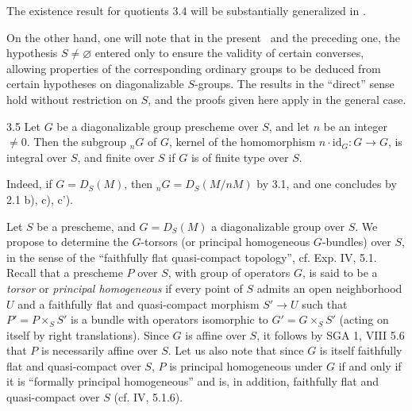\begin{remarks}{} The existence result for quotients 3.4 will be substantially generalized in .

On the other hand, one will note that in the present \No\ and the preceding one, the hypothesis $S\ne\varnothing$ entered only to ensure the validity of certain converses, allowing properties of the corresponding ordinary groups to be deduced from certain hypotheses on diagonalizable $S$-groups. The results in the ``direct'' sense hold without restriction on $S$, and the proofs given here apply in the general case.
\end{remarks}
\begin{corollary}{3.5}\label{VIII.3.5}
Let $G$ be a diagonalizable group prescheme over $S$, and let $n$ be an integer $\ne0$. Then the subgroup ${}_nG$ of $G$, kernel of the homomorphism $n\cdot\mathrm{id}_G:G\to G$, is integral over $S$, and finite over $S$ if $G$ is of finite type over $S$.
\end{corollary}
Indeed, if $G=D_S(M)$, then ${}_nG=D_S(M/nM)$ by 3.1, and one concludes by 2.1 b), c), c').

Let $S$ be a prescheme, and $G=D_S(M)$ a diagonalizable group over $S$. We propose to determine the $G$-torsors (or principal homogeneous $G$-bundles) over $S$, in the sense of the ``faithfully flat quasi-compact topology'', cf. Exp. IV, 5.1. Recall that a prescheme $P$ over $S$, with group of operators $G$, is said to be a \emph{torsor} or \emph{principal homogeneous} if every point of $S$ admits an open neighborhood $U$ and a faithfully flat and quasi-compact morphism $S'\to U$ such that $P'=P\times_S S'$ is a bundle with operators isomorphic to $G'=G\times_S S'$ (acting on itself by right translations). Since $G$ is affine over $S$, it follows by SGA 1, VIII 5.6 that $P$ is necessarily affine over $S$. Let us also note that since $G$ is itself faithfully flat and quasi-compact over $S$, $P$ is principal homogeneous under $G$ if and only if it is ``formally principal homogeneous'' and is, in addition, faithfully flat and quasi-compact over $S$ (cf. IV, 5.1.6).

